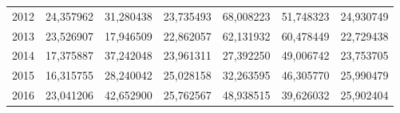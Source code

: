 \begin{table}
\begin{tabular}{p{1cm}p{2cm}p{2cm}p{2cm}p{2cm}p{2cm}p{2cm}}
 2012 &            24,357962 &    31,280438 &                      23,735493 &   68,008223 & 51,748323 &                        24,930749 \\
 2013 &            23,526907 &    17,946509 &                      22,862057 &   62,131932 & 60,478449 &                        22,729438 \\
 2014 &            17,375887 &    37,242048 &                      23,961311 &   27,392250 & 49,006742 &                        23,753705 \\
 2015 &            16,315755 &    28,240042 &                      25,028158 &   32,263595 & 46,305770 &                        25,990479 \\
 2016 &            23,041206 &    42,652900 &                      25,762567 &   48,938515 & 39,626032 &                        25,902404 \\
\bottomrule
\end{tabular}
\end{table}
